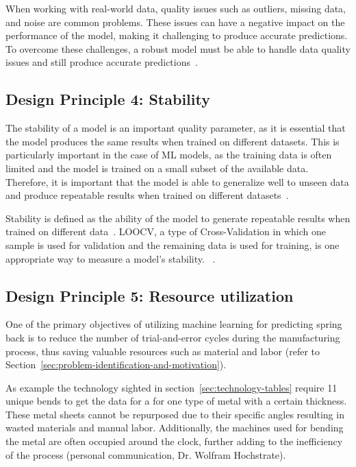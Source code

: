 When working with real-world data, quality issues such as outliers, missing data, and
noise are common problems.
These issues can have a negative impact on the performance of the model, making it challenging to produce accurate
predictions.
To overcome these challenges, a robust model must be able to handle data quality issues and still produce
accurate predictions~\cite[p. 16]{siebert2022construction}.


\subsection*{Design Principle 4: Stability}


The stability of a model is an important quality parameter, as it is essential that
the model produces the same results when trained on different datasets.
This is particularly important in the case of \ac{ML} models, as the training data
is often limited and the model is trained on a small subset of the available data.
Therefore, it is important that the model is able to generalize well to unseen data and
produce repeatable results when trained on different
datasets~\cite[p. 16]{siebert2022construction}.

Stability is defined as the ability of the model to generate repeatable
results when trained on different data~\cite[p. 16]{siebert2022construction}.
LOOCV, a type of Cross-Validation in which one sample is used for validation and the remaining data is used for
training, is one appropriate way to measure a model's stability.
~\cite[p. 200--201]{gareth2013introduction}.

\subsection*{Design Principle 5: Resource utilization}\label{subsec:dp5-resource-utilization}
One of the primary objectives of utilizing machine learning for predicting spring back is to
reduce the number of trial-and-error cycles during the manufacturing process, thus saving
valuable resources such as material and labor
(refer to Section~\ref{sec:problem-identification-and-motivation}).

As example the technology sighted in section~\ref{sec:technology-tables} require 11 unique bends to get the data
for a for one type of metal with a certain thickness.
These metal sheets cannot be repurposed due to their specific angles resulting in wasted materials and manual labor.
Additionally, the machines used for bending the metal are often occupied around the clock, further adding to the
inefficiency of the process (personal communication, Dr. Wolfram Hochstrate).

